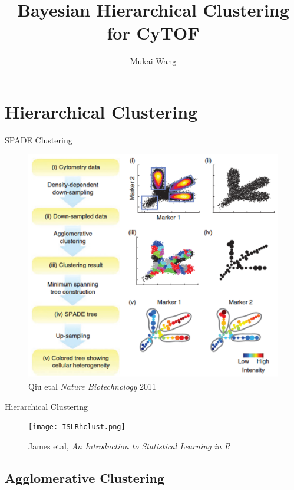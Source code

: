 \documentclass{beamer}
\title[Bayesian Hierarchical Clustering]{Bayesian Hierarchical Clustering for CyTOF}
\author{Mukai Wang}
\begin{document}
	
	
	\begin{frame}
		\titlepage
	\end{frame}
	
	\begin{frame}
		\tableofcontents[hideallsubsections]
	\end{frame}

	\section{Hierarchical Clustering}
	
	
	
	
	\begin{frame}{SPADE Clustering}
		\begin{figure}[htbp]
			\centering
			\includegraphics[scale=0.45]{SPADE.png}
			\caption*{Qiu etal \emph{Nature Biotechnology} 2011}
		\end{figure}
	\end{frame}
	
	\begin{frame}{Hierarchical Clustering}
		\begin{figure}[htbp]
			\centering
			\texttt{[image: ISLRhclust.png]}
			\caption*{James etal, \emph{An Introduction to Statistical Learning in R}}
		\end{figure}
	\end{frame}
	\subsection{Agglomerative Clustering}
	\begin{frame}
		\tableofcontents
		[
		currentsection,
		currentsubsection,
		subsectionstyle=show/shaded/hide
		]
	\end{frame}
	
\end{document}
